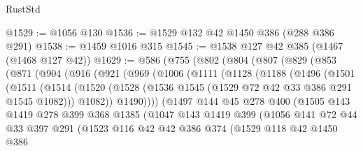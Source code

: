 \begin{lexlean}{RustStd}
\begin{coremodule}
@1529 := @1056 @130
@1536 := @1529 @132 @42 @1450 @386 (@288 @386 @291)
@1538 := @1459 @1016 @315
@1545 := @1538 @127 @42 @385 (@1467 (@1468 @127 @42))
@1629 := @586
    (@755
      (@802
        (@804
          (@807
            (@829
              (@853
                (@871
                  (@904
                    (@916
                      (@921
                        (@969
                          (@1006
                            (@1111
                              (@1128
                                (@1188
                                  (@1496
                                    (@1501
                                      (@1511
                                        (@1514
                                          (@1520
                                            (@1528
                                              (@1536
                                                @1545
                                                (@1529 @72 @42 @33 @386 @291 @1545 @1082)))
                                            @1082))
                                        @1490))))
                                (@1497
                                  @144
                                  @45
                                  @278
                                  @400
                                  (@1505
                                    @143
                                    @1419
                                    @278
                                    @399
                                    @368
                                    @1385
                                    (@1047
                                      @143
                                      @1419
                                      @399
                                      (@1056
                                        @141
                                        @72
                                        @44
                                        @33
                                        @397
                                        @291
                                        (@1523
                                          @116
                                          @42
                                          @42
                                          @386
                                          @374
                                          (@1529
                                            @118
                                            @42
                                            @1450
                                            @386

\end{coremodule}
\end{lexlean}

